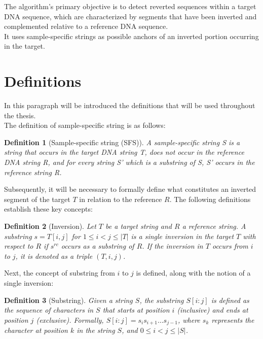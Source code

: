 \newtheorem{definition}{Definition}
\newtheorem{example}{Example}

The algorithm's primary objective is to detect reverted sequences within a target DNA sequence, which are characterized by segments that have been inverted and complemented relative to a reference DNA sequence. \\
It uses sample-specific strings as possible anchors of an inverted portion occurring in the target.

\section{Definitions}
In this paragraph will be introduced the definitions that will be used throughout the thesis. \\
The definition of sample-specific string\cite{khorsand_comparative_2021} is as follows:

\begin{definition}[Sample-specific string (SFS)]
A sample-specific string S is a string that occurs in the target DNA string T, does not occur in the reference DNA string R, and for every string S' which is a substring of S, S' occurs in the reference string R. 
\label{thm:sample_specific}
\end{definition} 

Subsequently, it will be necessary to formally define what constitutes an inverted segment of the target $T$ in relation to the reference $R$. The following definitions establish these key concepts:

\begin{definition}[Inversion]
Let $T$ be a target string and $R$ a reference string. A substring $s = T[i,j]$ for $1 \leq i < j \leq |T|$ is a single inversion in the target $T$ with respect to $R$ if $s^{rc}$ occurs as a substring of $R$. If the inversion in $T$ occurs from $i$ to $j$, it is denoted as a triple $(T, i, j)$.
\end{definition}

Next, the concept of substring from $i$ to $j$ is defined, along with the notion of a single inversion:

\begin{definition}[Substring]
Given a string \( S \), the substring \( S[i:j] \) is defined as the sequence of characters in \( S \) that starts at position \( i \) (inclusive) and ends at position \( j \) (exclusive). Formally, \( S[i:j] = s_i s_{i+1} \ldots s_{j-1} \), where \( s_k \) represents the character at position \( k \) in the string \( S \), and \( 0 \leq i < j \leq |S| \).
\end{definition}

